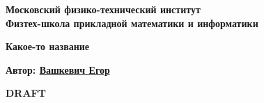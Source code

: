 
\begin{titlepage}
  \clearpage\thispagestyle{empty}
  \centering

  \textbf{Московский физико-технический институт \\ Физтех-школа прикладной математики и информатики}

  \vspace{10ex}

  {\textbf{Какое-то название}}

  \vspace{10ex}

  {\textbf{Автор: \href{https://vk.com/id251150059}{Вашкевич Егор}}}

  \vspace{10ex}





  \ifdraft    %
    \begin{tcolorbox}
      \centering
      \bfseries\Huge{DRAFT}
    \end{tcolorbox}
  \else
  \fi

  \vfill

  \pagebreak
\end{titlepage}
